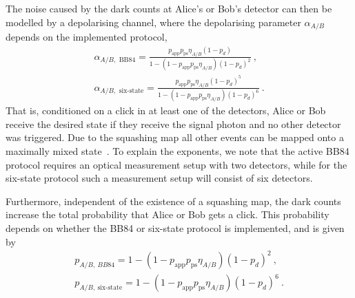 \documentclass[aps,pra,reprint,superscriptaddress]{revtex4-1}
\begin{document}
The noise caused by the dark counts at Alice's or Bob's detector can then be modelled by a depolarising channel, where the depolarising parameter $\alpha_{A/B}$ depends on the implemented protocol,
\begin{align}
\alpha_{A/B,\textrm{ BB84}} = \frac{p_{\textrm{app}} p_{\textrm{ps}}\eta_{A/B}(1-p_d)}{1-(1-p_{\textrm{app}} p_{\textrm{ps}}\eta_{A/B})(1-p_d)^2}\ , \\
\alpha_{A/B, \textrm{ six-state}} = \frac{p_{\textrm{app}} p_{\textrm{ps}}\eta_{A/B}(1-p_d)^5}{1-(1-p_{\textrm{app}} p_{\textrm{ps}}\eta_{A/B})(1-p_d)^6}\ .
\end{align}
That is, conditioned on a click in at least one of the detectors, Alice or Bob receive the desired state if they receive the signal photon and no other detector was triggered. Due to the squashing map all other events can be mapped onto a maximally mixed state~\cite{gittsovich2014squashing,beaudry2008squashing}. To explain the exponents, we note that the active BB84 protocol requires an optical measurement setup with two detectors, while for the six-state protocol such a measurement setup will consist of six detectors. 

Furthermore, independent of the existence of a squashing map, the dark counts increase the total probability that Alice or Bob gets a click. This probability depends on whether the BB84 or six-state protocol is implemented, and is given by
\begin{align}
p_{A/B,~BB84} = 1 - (1-p_{\textrm{app}} p_{\textrm{ps}}\eta_{A/B})(1-p_d)^2\ , \label{eq:ps1} \\
p_{A/B,~\textrm{six-state}} = 1 - (1-p_{\textrm{app}} p_{\textrm{ps}}\eta_{A/B})(1-p_d)^6\ .
\label{eq:ps2}
\end{align}
\end{document}

